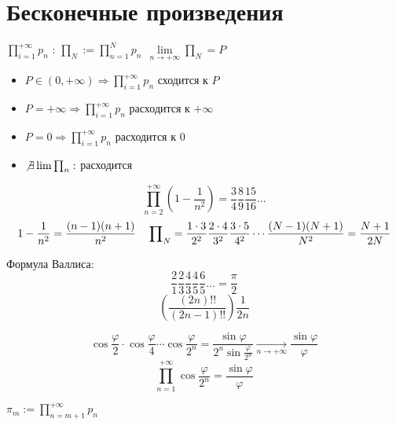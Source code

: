 

\cfoot{}

\renewcommand{\thesubsection}{\arabic{subsection}.}


\section*{Бесконечные произведения}

\begin{definition}
    $\prod\limits_{i=1}^{+\infty} p_n$ : $\prod_N := \prod\limits_{n=1}^N p_n \ \ \lim\limits_{n\to+\infty}\prod_N=P$

    \begin{itemize}
        \item $P\in (0, +\infty) \Rightarrow \prod\limits_{i=1}^{+\infty} p_n$ сходится к $P$
        \item $P=+\infty \Rightarrow \prod\limits_{i=1}^{+\infty} p_n$ расходится к $+\infty$
        \item $P=0 \Rightarrow \prod\limits_{i=1}^{+\infty} p_n$ расходится к $0$
        \item $\not\exists\lim \prod_n :$ расходится
    \end{itemize}
\end{definition}

\begin{example}
    $$\prod_{n=2}^{+\infty}\left(1-\frac{1}{n^2}\right)=\frac{3}{4}\frac{8}{9}\frac{15}{16}\ldots$$
    $$1-\frac{1}{n^2}=\frac{(n-1)(n+1)}{n^2} \quad \sideset{}{_N}\prod = \frac{1\cdot 3}{2^2}\frac{2\cdot4}{3^2}\frac{3\cdot5}{4^2}\cdots\frac{(N-1)(N+1)}{N^2} = \frac{N+1}{2N}$$
\end{example}

\begin{example}
    Формула Валлиса:
    $$\frac{2}{1}\frac{2}{3}\frac{4}{3}\frac{4}{5}\frac{6}{5}\ldots=\frac{\pi}{2}$$
    $$\left(\frac{(2n)!!}{(2n-1)!!}\right)\frac{1}{2n}$$
\end{example}

\begin{example}
    $$\cos\frac{\varphi}{2}\cdot\cos\frac{\varphi}{4}\cdots\cos\frac{\varphi}{2^n}=\frac{\sin\varphi}{2^n\sin\frac{\varphi}{2^n}}\xrightarrow[n\to+\infty]{}\frac{\sin\varphi}{\varphi}$$
    $$\prod_{n=1}^{+\infty}\cos\frac{\varphi}{2^n}=\frac{\sin\varphi}{\varphi}$$
\end{example}

\begin{definition}
    $\pi_m:=\prod\limits_{n=m+1}^{+\infty} p_n$
\end{definition}

